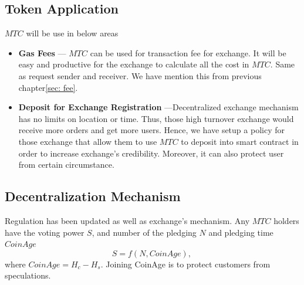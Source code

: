 \documentclass[UTF8,nofonts]{article}
\begin{document}
\subsection{Token Application}

$MTC$ will be use in below areas

\begin{itemize}
 \item \textbf{Gas Fees} --- $MTC$ can be used for transaction fee for exchange. It will be easy and productive for the exchange to calculate all the cost in $MTC$. Same as request sender and receiver. We have mention this from previous chapter\ref{sec: fee}.
 \item \textbf{Deposit for Exchange Registration} ---Decentralized exchange mechanism has no limits on location or time. Thus,  those high turnover exchange would receive more orders and get more users. Hence,  we have setup a policy for those exchange that allow them to use $MTC$ to deposit into smart contract in order to increase exchange's credibility. Moreover,  it can also protect user from certain circumstance.
\end{itemize}

\subsection{Decentralization Mechanism}
Regulation has been updated as well as exchange's mechanism. Any $MTC$ holders have the voting power $S$, and number of the pledging $N$ and pledging time $CoinAge$
$$S = f(N,  CoinAge)\text{, }$$
where $CoinAge = H_{c}-H_{s}$. Joining CoinAge is to protect customers from speculations.
\end{document}
